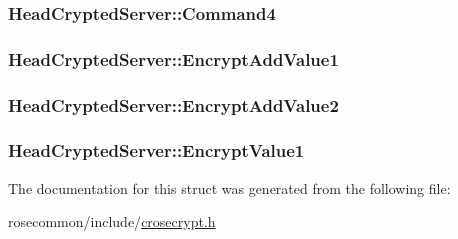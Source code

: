\subsubsection[{\texorpdfstring{Command4}{Command4}}]{ Head\+Crypted\+Server\+::\+Command4}\hypertarget{structHeadCryptedServer_a8540cd81ede34402268047ee2ab05eac}{}\label{structHeadCryptedServer_a8540cd81ede34402268047ee2ab05eac}
\subsubsection[{\texorpdfstring{Encrypt\+Add\+Value1}{EncryptAddValue1}}]{ Head\+Crypted\+Server\+::\+Encrypt\+Add\+Value1}\hypertarget{structHeadCryptedServer_ab5303f4e2cc68d5c7368773b1f323ce0}{}\label{structHeadCryptedServer_ab5303f4e2cc68d5c7368773b1f323ce0}
\subsubsection[{\texorpdfstring{Encrypt\+Add\+Value2}{EncryptAddValue2}}]{ Head\+Crypted\+Server\+::\+Encrypt\+Add\+Value2}\hypertarget{structHeadCryptedServer_adbf6980999ba39055a0d1cce76181f21}{}\label{structHeadCryptedServer_adbf6980999ba39055a0d1cce76181f21}
\subsubsection[{\texorpdfstring{Encrypt\+Value1}{EncryptValue1}}]{ Head\+Crypted\+Server\+::\+Encrypt\+Value1}\hypertarget{structHeadCryptedServer_ac7eb21ed5fab9631dcbbf53a323074ad}{}\label{structHeadCryptedServer_ac7eb21ed5fab9631dcbbf53a323074ad}


The documentation for this struct was generated from the following file\+:\begin{DoxyCompactItemize}
\item 
rosecommon/include/\hyperlink{crosecrypt_8h}{crosecrypt.\+h}\end{DoxyCompactItemize}
